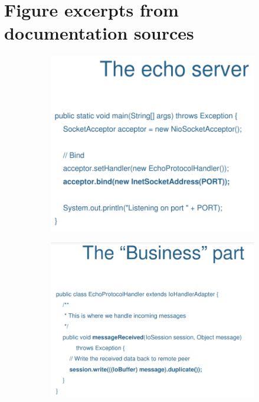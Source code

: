 \section{Figure excerpts from documentation sources}
\begin{figure}[H]
    \centering
    \begin{subfigure}[b]{0.5\textwidth}
         \centering
         \includegraphics[width=\textwidth]{images/usability_extensibility1.png}
     \end{subfigure}
   
     \begin{subfigure}[b]{0.5\textwidth}
         \centering
         \includegraphics[width=\textwidth]{images/usability_extensibility2.png}
     \end{subfigure}
   

\end{figure}
